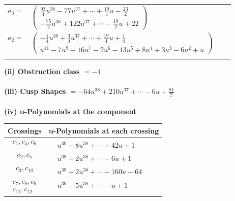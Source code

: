\documentclass[1p]{elsarticle_modified}
\theoremstyle{definition}
\begin{document}
\begin{tabular}{m{7pt} m{180pt} m{7pt} m{180pt} }
\flushright $a_{3}=$&$\begin{pmatrix}\frac{93}{4} u^{38}-77 u^{37}+\cdots+\frac{19}{4} u-\frac{23}{2}\\-\frac{75}{2} u^{38}+122 u^{37}+\cdots-\frac{19}{2} u+22\end{pmatrix}$ \\
\flushright $a_{2}=$&$\begin{pmatrix}-\frac{1}{4} u^{38}+\frac{3}{4} u^{37}+\cdots+\frac{19}{4} u+\frac{1}{4}\\u^{11}-7 u^9+16 u^7-2 u^6-13 u^5+8 u^4+3 u^3-6 u^2+u\end{pmatrix}$\\&\end{tabular}
\flushleft \textbf{(ii) Obstruction class $= -1$}\\~\\
\flushleft \textbf{(iii) Cusp Shapes $= -64 u^{38}+210 u^{37}+\cdots-6 u+\frac{81}{2}$}\\~\\
\newpage\renewcommand{\arraystretch}{1}
\flushleft \textbf{(iv) u-Polynomials at the component}\newline \\
\begin{tabular}{m{50pt}|m{274pt}}
Crossings & \hspace{64pt}u-Polynomials at each crossing \\
\hline $$\begin{aligned}c_{1},c_{4},c_{6}\end{aligned}$$&$\begin{aligned}
&u^{39}+8 u^{38}+\cdots+42 u+1
\end{aligned}$\\
\hline $$\begin{aligned}c_{2},c_{5}\end{aligned}$$&$\begin{aligned}
&u^{39}+2 u^{38}+\cdots-6 u+1
\end{aligned}$\\
\hline $$\begin{aligned}c_{3},c_{10}\end{aligned}$$&$\begin{aligned}
&u^{39}+2 u^{38}+\cdots-160 u-64
\end{aligned}$\\
\hline $$\begin{aligned}c_{7},c_{8},c_{9}\\c_{11},c_{12}\end{aligned}$$&$\begin{aligned}
&u^{39}-5 u^{38}+\cdots- u+1
\end{aligned}$\\
\hline
\end{tabular}\\~\\
\end{document}
